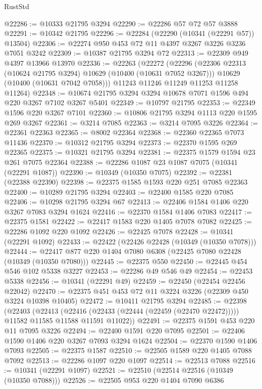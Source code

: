 \begin{lexlean}{RustStd}
\begin{coremodule}
@22286 := @10333 @21795 @3294
@22290 := @22286 @57 @72 @57 @3888
@22291 := @10342 @21795
@22296 := @22284 (@22290 (@10341 (@22291 @57)) @13504)
@22306 := @22274 @950 @453 @72 @11 @4397 @3267 @3226 @3236 @7051 @3242
@22309 := @10387 @21795 @3294 @72
@22313 := @22309 @949 @4397 @13966 @13970
@22336 := @22263
    (@22272
      (@22296
        (@22306 @22313 (@10624 @21795 @3294) @10629 (@10400 (@10631 @7052 @3267)))
        @10629
        (@10400 (@10631 @7042 @7058)))
      @11243
      @11246
      @11249
      @11253
      @11258
      @11264)
@22348 := @10674 @21795 @3294 @3294 @10678 @7071 @1596 @494 @220 @3267 @7102 @3267 @5401
@22349 := @10797 @21795
@22353 := @22349 @1596 @220 @3267 @7101
@22360 := @10806 @21795 @3294 @1113 @220 @1595 @269 @3267
@22361 := @3214 @7085
@22363 := @3214 @7095 @3226
@22364 := @22361 @22363
@22365 := @8002 @22364
@22368 := @22360 @22365 @7073 @11436
@22370 := @10312 @21795 @3294
@22373 := @22370 @1595 @269 @22365
@22375 := @10321 @21795 @3294
@22381 := @22375 @1579 @1594 @23 @261 @7075 @22364
@22388 := @22286 @1087 @23 @1087 @7075 (@10341 (@22291 @1087))
@22390 := @10349 (@10350 @7075)
@22392 := @22381 (@22388 @22390)
@22398 := @22375 @1585 @1593 @220 @251 @7085 @22363
@22400 := @10289 @21795 @3294
@22403 := @22400 @1585 @220 @7085
@22406 := @10298 @21795 @3294 @67
@22413 := @22406 @1584 @1406 @220 @3267 @7083 @3294 @1624
@22416 := @22370 @1584 @1406 @7083
@22417 := @22375 @1581
@22422 := @22417 @1583 @220 @1405 @7078 @7082
@22425 := @22286 @1092 @220 @1092
@22426 := @22425 @7078
@22428 := @10341 (@22291 @1092)
@22433 := @22422 (@22426 @22428 (@10349 (@10350 @7078)))
@22444 := @22417 @877 @220 @1404 @7080 @6308 (@22425 @7080 @22428 (@10349 (@10350 @7080)))
@22445 := @22375 @550
@22450 := @22445 @454 @546 @102 @5338 @3227
@22453 := @22286 @49 @546 @49
@22454 := @22453 @5338
@22456 := @10341 (@22291 @49)
@22459 := @22450 (@22454 @22456 @22042)
@22470 := @22375 @451 @453 @72 @11 @3224 @3226 (@22309 @450 @3224 @10398 @10405)
@22472 := @10411 @21795 @3294
@22485 := @22398
    (@22403
      (@22413
        (@22416 (@22433 (@22444 (@22459 (@22470 @22472)))))
        @11582
        @11585
        @11588
        @11591
        @11022))
@22491 := @22375 @1591 @453 @220 @11 @7095 @3226
@22494 := @22400 @1591 @220 @7095
@22501 := @22406 @1590 @1406 @220 @3267 @7093 @3294 @1624
@22504 := @22370 @1590 @1406 @7093
@22505 := @22375 @1587
@22510 := @22505 @1589 @220 @1405 @7088 @7092
@22513 := @22286 @1097 @220 @1097
@22514 := @22513 @7088
@22516 := @10341 (@22291 @1097)
@22521 := @22510 (@22514 @22516 (@10349 (@10350 @7088)))
@22526 := @22505 @953 @220 @1404 @7090 @6386

\end{coremodule}
\end{lexlean}
